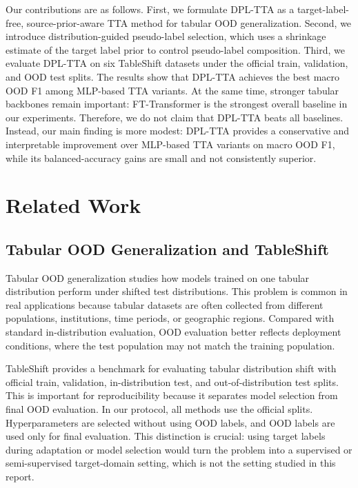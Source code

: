 Our contributions are as follows. First, we formulate DPL-TTA as a target-label-free, source-prior-aware TTA method for tabular OOD generalization. Second, we introduce distribution-guided pseudo-label selection, which uses a shrinkage estimate of the target label prior to control pseudo-label composition. Third, we evaluate DPL-TTA on six TableShift datasets under the official train, validation, and OOD test splits. The results show that DPL-TTA achieves the best macro OOD F1 among MLP-based TTA variants. At the same time, stronger tabular backbones remain important: FT-Transformer is the strongest overall baseline in our experiments. Therefore, we do not claim that DPL-TTA beats all baselines. Instead, our main finding is more modest: DPL-TTA provides a conservative and interpretable improvement over MLP-based TTA variants on macro OOD F1, while its balanced-accuracy gains are small and not consistently superior.

%

\section{Related Work}

\subsection{Tabular OOD Generalization and TableShift}

Tabular OOD generalization studies how models trained on one tabular distribution perform under shifted test distributions. This problem is common in real applications because tabular datasets are often collected from different populations, institutions, time periods, or geographic regions. Compared with standard in-distribution evaluation, OOD evaluation better reflects deployment conditions, where the test population may not match the training population.

TableShift provides a benchmark for evaluating tabular distribution shift with official train, validation, in-distribution test, and out-of-distribution test splits. This is important for reproducibility because it separates model selection from final OOD evaluation. In our protocol, all methods use the official splits. Hyperparameters are selected without using OOD labels, and OOD labels are used only for final evaluation. This distinction is crucial: using target labels during adaptation or model selection would turn the problem into a supervised or semi-supervised target-domain setting, which is not the setting studied in this report.


